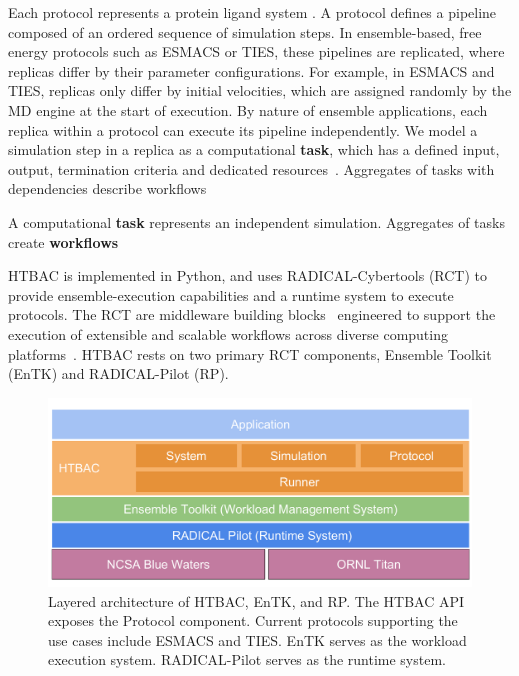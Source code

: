 Each protocol represents a protein ligand system . A protocol 
defines a %
pipeline composed of an ordered sequence of simulation steps. In
ensemble-based, free energy protocols such as ESMACS or TIES, these
pipelines are replicated, where replicas differ by their parameter
configurations. For example, in ESMACS and TIES, replicas only differ by initial
velocities, which are assigned randomly by the MD engine at the start of
execution. By nature of ensemble applications, each replica within a protocol
can execute its pipeline independently. We model a simulation step in a 
replica as a computational \textbf{task}, which has a defined input, output, 
termination criteria and dedicated resources~\cite{power-of-many17}. Aggregates 
of tasks with dependencies describe workflows

A computational
\textbf{task} represents an independent simulation. Aggregates of tasks
create \textbf{workflows} 

HTBAC is implemented in Python, and uses RADICAL-Cybertools (RCT) to provide
ensemble-execution capabilities and a runtime system to execute protocols.
The RCT are middleware building blocks~\cite{review_bb_2016} engineered to
support the execution of extensible and scalable workflows across diverse
computing platforms~\cite{turilli2017comprehensive}. HTBAC rests on two
primary RCT components, Ensemble Toolkit (EnTK) and RADICAL-Pilot (RP).


\begin{figure}
  \centering
  \includegraphics[width=\columnwidth]{figures/building_blocks.pdf}
  \caption{Layered architecture of HTBAC, EnTK, and RP. The HTBAC API
  exposes the Protocol component. Current protocols supporting the use cases
  include ESMACS and TIES. EnTK serves as the workload execution system.
  RADICAL-Pilot serves as the runtime system.}
\label{fig:blockdiagram}
\end{figure}

